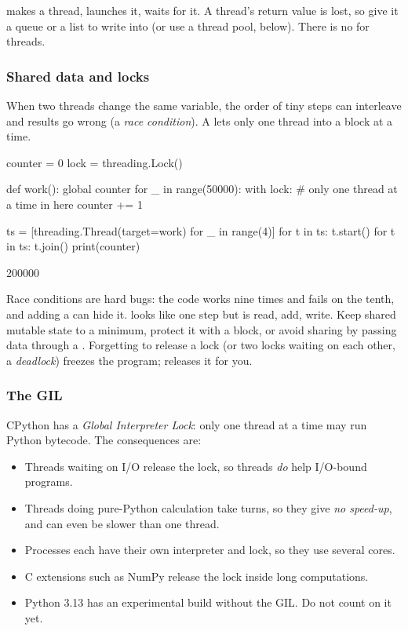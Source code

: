  makes a thread,  launches it, 
waits for it. A thread's return value is lost, so give it a queue or a list to write into (or use
a thread pool, below). There is no  for threads.

\subsubsection*{Shared data and locks}

When two threads change the same variable, the order of tiny steps can interleave and results go
wrong (a \emph{race condition}). A  lets only one thread into a block at a time.

\begin{pycode}
counter = 0
lock = threading.Lock()

def work():
    global counter
    for _ in range(50000):
        with lock:                # only one thread at a time in here
            counter += 1

ts = [threading.Thread(target=work) for _ in range(4)]
for t in ts:
    t.start()
for t in ts:
    t.join()
print(counter)
\end{pycode}
\begin{rawcode}
200000
\end{rawcode}

\begin{trap}
Race conditions are hard bugs: the code works nine times and fails on the tenth, and adding a
 can hide it.  looks like one step but is read, add, write. Keep
shared mutable state to a minimum, protect it with a  block, or avoid sharing
by passing data through a . Forgetting to release a lock (or two locks waiting on
each other, a \emph{deadlock}) freezes the program;  releases it for you.
\end{trap}

\subsubsection*{The GIL}

CPython has a \emph{Global Interpreter Lock}: only one thread at a time may run Python bytecode.
The consequences are:

\begin{itemize}[nosep]
  \item Threads waiting on I/O release the lock, so threads \emph{do} help I/O-bound programs.
  \item Threads doing pure-Python calculation take turns, so they give \emph{no speed-up}, and
        can even be slower than one thread.
  \item Processes each have their own interpreter and lock, so they use several cores.
  \item C extensions such as NumPy release the lock inside long computations.
  \item Python 3.13 has an experimental build without the GIL. Do not count on it yet.
\end{itemize}

